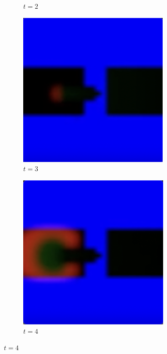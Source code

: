 \begin{figure}
\begin{subfigure}{0.24\textwidth}
		\caption*{$t = 2$}
	\end{subfigure}
    \begin{subfigure}{0.24\textwidth}
		\includegraphics[width=\linewidth]{diode/hard/Screenshot 2024-03-09 at 16.23.55.png}
		\caption*{$t = 3$}
	\end{subfigure}
    \begin{subfigure}{0.24\textwidth}
		\includegraphics[width=\linewidth]{diode/hard/Screenshot 2024-03-09 at 16.24.01.png}
		\caption*{$t = 4$}
	\end{subfigure}


\end{figure}
